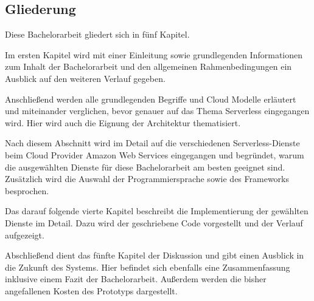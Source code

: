 \subsection{Gliederung}

Diese Bachelorarbeit gliedert sich in fünf Kapitel.

Im ersten Kapitel wird mit einer Einleitung sowie grundlegenden Informationen zum Inhalt der Bachelorarbeit und den allgemeinen Rahmenbedingungen ein Ausblick auf den weiteren Verlauf gegeben.

Anschließend werden alle grundlegenden Begriffe und Cloud Modelle erläutert und miteinander verglichen, bevor genauer auf das Thema Serverless eingegangen wird.
Hier wird auch die Eignung der Architektur thematisiert.

Nach diesem Abschnitt wird im Detail auf die verschiedenen Serverless-Dienste beim Cloud Provider Amazon Web Services eingegangen und begründet, warum die ausgewählten Dienste für diese Bachelorarbeit am besten geeignet sind.
Zusätzlich wird die Auswahl der Programmiersprache sowie des Frameworks besprochen.

Das darauf folgende vierte Kapitel beschreibt die Implementierung der gewählten Dienste im Detail. Dazu wird der geschriebene Code vorgestellt und der Verlauf aufgezeigt.

Abschließend dient das fünfte Kapitel der Diskussion und gibt einen Ausblick in die Zukunft des Systems.
Hier befindet sich ebenfalls eine Zusammenfassung inklusive einem Fazit der Bachelorarbeit.
Außerdem werden die bisher angefallenen Kosten des Prototyps dargestellt.


